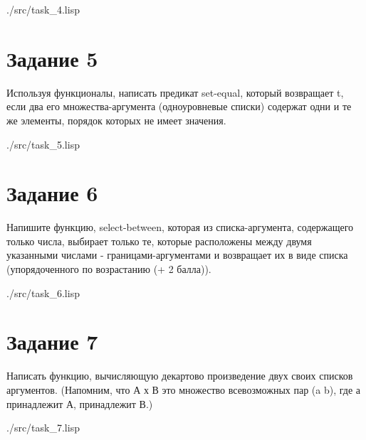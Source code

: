 \begin{lstinputlisting}[
	caption={Задание 4},
	label={lst:t4},
	style={lsp},
	]{./src/task_4.lisp}
\end{lstinputlisting}

\section*{Задание 5}

Используя функционалы, написать предикат set-equal, который возвращает t, если два
его множества-аргумента (одноуровневые списки) содержат одни и те же элементы,
порядок которых не имеет значения.

\begin{lstinputlisting}[
	caption={Задание 5},
	label={lst:t5},
	style={lsp},
	]{./src/task_5.lisp}
\end{lstinputlisting}

\section*{Задание 6}

Напишите функцию, select-between, которая из списка-аргумента, содержащего только
числа, выбирает только те, которые расположены между двумя указанными числами -
границами-аргументами и возвращает их в виде списка (упорядоченного по
возрастанию (+ 2 балла)).

\begin{lstinputlisting}[
	caption={Задание 6},
	label={lst:t6},
	style={lsp},
	]{./src/task_6.lisp}
\end{lstinputlisting}

\section*{Задание 7}

 Написать функцию, вычисляющую декартово произведение двух своих списков аргументов. (Напомним, что А х В это множество всевозможных пар (a b), где а
принадлежит А, принадлежит В.)

\begin{lstinputlisting}[
	caption={Задание 7},
	label={lst:t7},
	style={lsp},
	]{./src/task_7.lisp}
\end{lstinputlisting}

